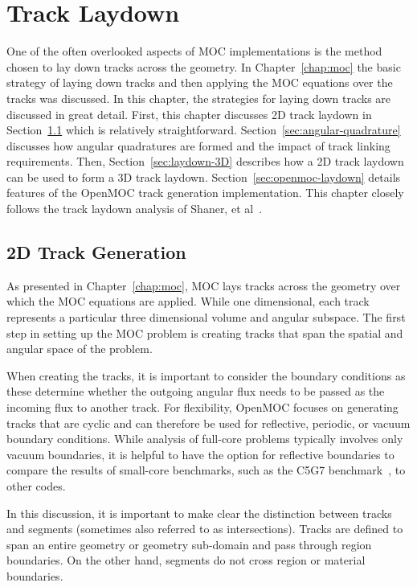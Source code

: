 \chapter{Track Laydown}
\label{chap:track-laydown}

One of the often overlooked aspects of \ac{MOC} implementations is the method chosen to lay down tracks across the geometry. In Chapter~\ref{chap:moc} the basic strategy of laying down tracks and then applying the \ac{MOC} equations over the tracks was discussed. In this chapter, the strategies for laying down tracks are discussed in great detail. First, this chapter discusses 2D track laydown in Section~\ref{sec:laydown-2D} which is relatively straightforward. Section~\ref{sec:angular-quadrature} discusses how angular quadratures are formed and the impact of track linking requirements. Then, Section~\ref{sec:laydown-3D} describes how a 2D track laydown can be used to form a 3D track laydown. Section~\ref{sec:openmoc-laydown} details features of the OpenMOC track generation implementation. This chapter closely follows the track laydown analysis of Shaner, et al~\cite{shaner-laydown}.

\section{2D Track Generation}
\label{sec:laydown-2D}

As presented in Chapter~\ref{chap:moc}, \ac{MOC} lays tracks across the geometry over which the \ac{MOC} equations are applied. While one dimensional, each track represents a particular three dimensional volume and angular subspace. The first step in setting up the \ac{MOC} problem is creating tracks that span the spatial and angular space of the problem.

When creating the tracks, it is important to consider the boundary conditions as these determine whether the outgoing angular flux needs to be passed as the incoming flux to another track. For flexibility, OpenMOC focuses on generating tracks that are cyclic and can therefore be used for reflective, periodic, or vacuum boundary conditions. While analysis of full-core problems typically involves only vacuum boundaries, it is helpful to have the option for reflective boundaries to compare the results of small-core benchmarks, such as the C5G7 benchmark~\cite{c5g7}, to other codes. 

In this discussion, it is important to make clear the distinction between tracks and segments (sometimes also referred to as intersections). Tracks are defined to span an entire geometry or geometry sub-domain and pass through region boundaries. On the other hand, segments do not cross region or material boundaries.

